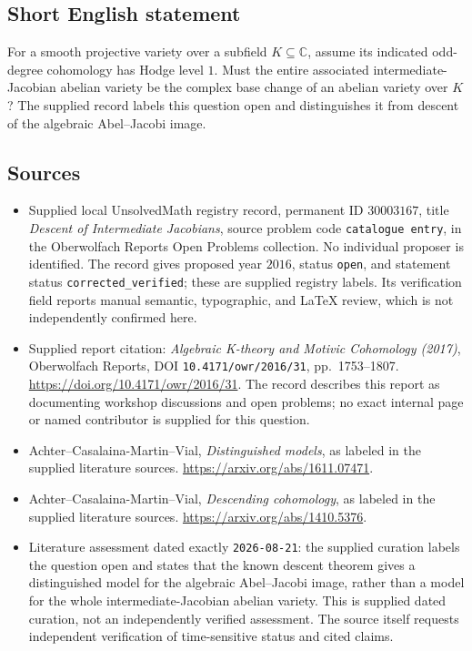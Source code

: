 \documentclass[11pt]{article}
\newcommand{\C}{\mathbb{C}}
\begin{document}
\subsection{Short English statement}
For a smooth projective variety over a subfield \(K\subseteq\C\), assume its indicated odd-degree cohomology has Hodge level \(1\). Must the entire associated intermediate-Jacobian abelian variety be the complex base change of an abelian variety over \(K\)? The supplied record labels this question open and distinguishes it from descent of the algebraic Abel--Jacobi image.
\subsection{Sources}
\begin{itemize}
\item Supplied local UnsolvedMath registry record, permanent ID \(30003167\), title \emph{Descent of Intermediate Jacobians}, source problem code \texttt{catalogue entry}, in the Oberwolfach Reports Open Problems collection. No individual proposer is identified. The record gives proposed year \(2016\), status \texttt{open}, and statement status \texttt{corrected\_verified}; these are supplied registry labels. Its verification field reports manual semantic, typographic, and LaTeX review, which is not independently confirmed here.
\item Supplied report citation: \emph{Algebraic K-theory and Motivic Cohomology (2017)}, Oberwolfach Reports, DOI \texttt{10.4171/owr/2016/31}, pp.~1753--1807. \url{https://doi.org/10.4171/owr/2016/31}. The record describes this report as documenting workshop discussions and open problems; no exact internal page or named contributor is supplied for this question.
\item Achter--Casalaina-Martin--Vial, \emph{Distinguished models}, as labeled in the supplied literature sources. \url{https://arxiv.org/abs/1611.07471}.
\item Achter--Casalaina-Martin--Vial, \emph{Descending cohomology}, as labeled in the supplied literature sources. \url{https://arxiv.org/abs/1410.5376}.
\item Literature assessment dated exactly \texttt{2026-08-21}: the supplied curation labels the question open and states that the known descent theorem gives a distinguished model for the algebraic Abel--Jacobi image, rather than a model for the whole intermediate-Jacobian abelian variety. This is supplied dated curation, not an independently verified assessment. The source itself requests independent verification of time-sensitive status and cited claims.
\end{itemize}
\end{document}
